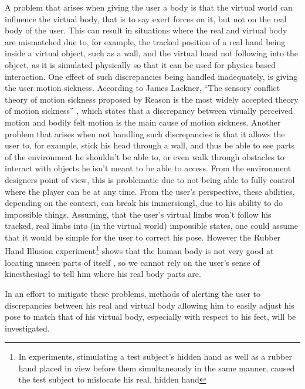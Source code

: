 A problem that arises when giving the user a body is that the virtual world can influence the virtual body, that is to say exert forces on it, but not on the real body of the user. This can result in situations where the real and virtual body are mismatched due to, for example, the tracked position of a real hand being inside a virtual object, such as a wall, and the virtual hand not following into the object, as it is simulated physically so that it can be used for physics based interaction.
\newline
One effect of such discrepancies being handled inadequately, is giving the user motion sickness. According to James Lackner, \enquote{The sensory conflict theory of motion sickness proposed by Reason \textelp{} is the most widely accepted theory of motion sickness} \autocite[p. ~11]{motionSickness}, which states that a discrepancy between visually perceived motion and bodily felt motion is the main cause of motion sickness. 
\newline
Another problem that arises when not handling such discrepancies is that it allows the user to, for example, stick his head through a wall, and thus be able to see parts of the environment he shouldn't be able to, or even walk through obstacles to interact with objects he isn't meant to be able to access. From the environment designers point of view, this is problematic due to not being able to fully control where the player can be at any time. From the user's perspective, these abilities, depending on the context, can break his \gls{immersiongl}, due to his ability to do impossible things. 
\newline
Assuming, that the user's virtual limbs won't follow his tracked, real limbs into (in the virtual world) impossible states, one could assume that it would be simple for the user to correct his pose. However the Rubber Hand Illusion experiment\footnote{In experiments, stimulating a test subject's hidden hand as well as a rubber hand placed in view before them simultaneously in the same manner, caused the test subject to mislocate his real, hidden hand} shows that the human body is not very good at locating unseen parts of itself \autocite{rubberHandsFeel}, so we cannot rely on the user's sense of \gls{kinesthesiagl} to tell him where his real body parts are.
\newline

In an effort to mitigate these problems, methods of alerting the user to discrepancies between his real and virtual body allowing him to easily adjust his pose to match that of his virtual body, especially with respect to his feet, will be investigated. 


